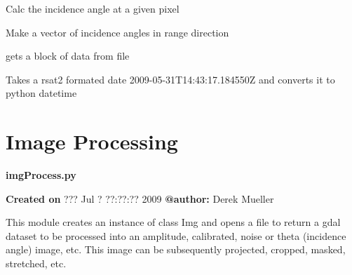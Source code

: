 \documentclass[letterpaper,10pt,english]{sphinxmanual}
\begin{document}

\begin{fulllineitems}
\label{code:Metadata.getThetaPixel}
Calc the incidence angle at a given pixel

\end{fulllineitems}


\begin{fulllineitems}
\label{code:Metadata.getThetaVector}
Make a vector of incidence angles in range direction

\end{fulllineitems}


\begin{fulllineitems}
\label{code:Metadata.get_data_block}
gets a block of data from file

\end{fulllineitems}


\begin{fulllineitems}
\label{code:Metadata.readdate}
Takes a rsat2 formated date 2009-05-31T14:43:17.184550Z
and converts it to python datetime

\end{fulllineitems}



\section{Image Processing}
\label{code:module-Image}\label{code:image-processing}
\textbf{imgProcess.py}

\textbf{Created on} ??? Jul  ? ??:??:?? 2009 \textbf{@author:} Derek Mueller

This module creates an instance of class Img and opens a file to return a
gdal dataset to be processed into an amplitude, calibrated, noise or theta
(incidence angle) image, etc. This image can be subsequently projected,
cropped, masked, stretched, etc.
\end{document}
